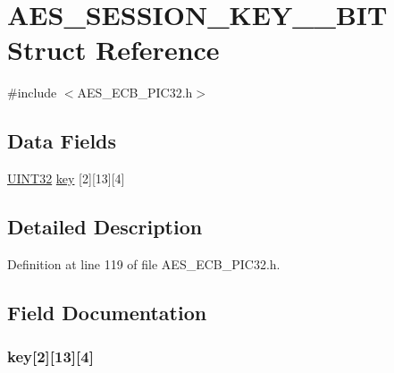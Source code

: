 \hypertarget{struct_a_e_s___s_e_s_s_i_o_n___k_e_y__192___b_i_t}{}\section{A\+E\+S\+\_\+\+S\+E\+S\+S\+I\+O\+N\+\_\+\+K\+E\+Y\+\_\+\_\+\+B\+I\+T Struct Reference}
\label{struct_a_e_s___s_e_s_s_i_o_n___k_e_y__192___b_i_t}


{\ttfamily \#include $<$A\+E\+S\+\_\+\+E\+C\+B\+\_\+\+P\+I\+C32.\+h$>$}

\subsection*{Data Fields}
\begin{DoxyCompactItemize}
\item 
\hyperlink{_generic_type_defs_8h_a1720f33f59b583f0c2ed071815623a86}{U\+I\+N\+T32} \hyperlink{struct_a_e_s___s_e_s_s_i_o_n___k_e_y__192___b_i_t_adf746864b4002370c5167afbb28a1edb}{key} \mbox{[}2\mbox{]}\mbox{[}13\mbox{]}\mbox{[}4\mbox{]}
\end{DoxyCompactItemize}


\subsection{Detailed Description}


Definition at line 119 of file A\+E\+S\+\_\+\+E\+C\+B\+\_\+\+P\+I\+C32.\+h.



\subsection{Field Documentation}
\hypertarget{struct_a_e_s___s_e_s_s_i_o_n___k_e_y__192___b_i_t_adf746864b4002370c5167afbb28a1edb}{}
\subsubsection[{key}]{ key\mbox{[}2\mbox{]}\mbox{[}13\mbox{]}\mbox{[}4\mbox{]}}\label{struct_a_e_s___s_e_s_s_i_o_n___k_e_y__192___b_i_t_adf746864b4002370c5167afbb28a1edb}


